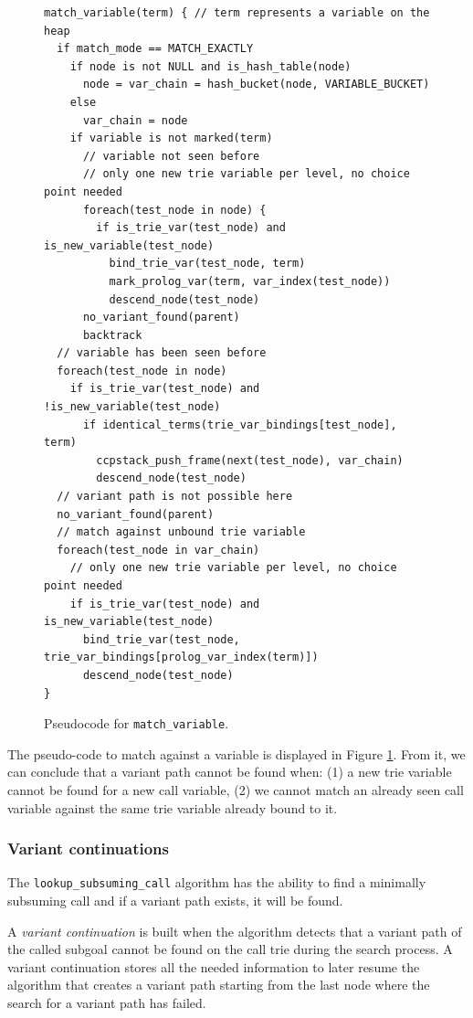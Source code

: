 \begin{figure}[ht]
\begin{Verbatim}[fontsize=\small]
match_variable(term) { // term represents a variable on the heap
  if match_mode == MATCH_EXACTLY
    if node is not NULL and is_hash_table(node)
      node = var_chain = hash_bucket(node, VARIABLE_BUCKET)
    else
      var_chain = node
    if variable is not marked(term)
      // variable not seen before
      // only one new trie variable per level, no choice point needed
      foreach(test_node in node) {
        if is_trie_var(test_node) and is_new_variable(test_node)
          bind_trie_var(test_node, term)
          mark_prolog_var(term, var_index(test_node))
          descend_node(test_node)
      no_variant_found(parent)
      backtrack
  // variable has been seen before
  foreach(test_node in node)
    if is_trie_var(test_node) and !is_new_variable(test_node)
      if identical_terms(trie_var_bindings[test_node], term)
        ccpstack_push_frame(next(test_node), var_chain)
        descend_node(test_node)
  // variant path is not possible here
  no_variant_found(parent)
  // match against unbound trie variable
  foreach(test_node in var_chain)
    // only one new trie variable per level, no choice point needed
    if is_trie_var(test_node) and is_new_variable(test_node)
      bind_trie_var(test_node, trie_var_bindings[prolog_var_index(term)])
      descend_node(test_node)
}
\end{Verbatim}
\caption{Pseudo\-code for \texttt{match\_variable}.}
\label{fig:match_variable}
\end{figure}

The pseudo-code to match against a variable is displayed in Figure
\ref{fig:match_variable}. From it, we can conclude that a variant path
cannot be found when: (1) a new trie variable cannot be found
for a new call variable, (2) we cannot match an already seen
call variable against the same trie variable already bound to it.

\subsubsection{Variant continuations}

The \texttt{lookup\_subsuming\_call} algorithm has the ability to find a
minimally subsuming call and if a variant path exists, it will be found.

A \textit{variant continuation} is built when the algorithm detects that a variant path of the
called subgoal cannot be found on the call trie during the search process.
A variant continuation stores all the needed information to later resume
the algorithm that creates a variant path starting from the last node where the
search for a variant path has failed.


